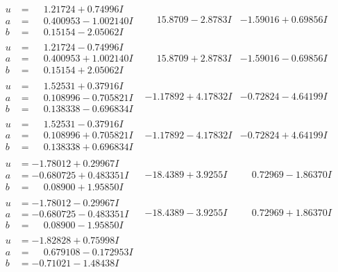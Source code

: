 \documentclass[1p]{elsarticle_modified}
\theoremstyle{definition}
\begin{document}
$$\begin{array}{c|c|c}
\begin{aligned}
u &= \phantom{-}1.21724 + 0.74996 I \\
a &= \phantom{-}0.400953 - 1.002140 I \\
b &= \phantom{-}0.15154 - 2.05062 I\end{aligned}
 & \phantom{-}15.8709 - 2.8783 I & -1.59016 + 0.69856 I \\ \hline\begin{aligned}
u &= \phantom{-}1.21724 - 0.74996 I \\
a &= \phantom{-}0.400953 + 1.002140 I \\
b &= \phantom{-}0.15154 + 2.05062 I\end{aligned}
 & \phantom{-}15.8709 + 2.8783 I & -1.59016 - 0.69856 I \\ \hline\begin{aligned}
u &= \phantom{-}1.52531 + 0.37916 I \\
a &= \phantom{-}0.108996 - 0.705821 I \\
b &= \phantom{-}0.138338 - 0.696834 I\end{aligned}
 & -1.17892 + 4.17832 I & -0.72824 - 4.64199 I \\ \hline\begin{aligned}
u &= \phantom{-}1.52531 - 0.37916 I \\
a &= \phantom{-}0.108996 + 0.705821 I \\
b &= \phantom{-}0.138338 + 0.696834 I\end{aligned}
 & -1.17892 - 4.17832 I & -0.72824 + 4.64199 I \\ \hline\begin{aligned}
u &= -1.78012 + 0.29967 I \\
a &= -0.680725 + 0.483351 I \\
b &= \phantom{-}0.08900 + 1.95850 I\end{aligned}
 & -18.4389 + 3.9255 I & \phantom{-}0.72969 - 1.86370 I \\ \hline\begin{aligned}
u &= -1.78012 - 0.29967 I \\
a &= -0.680725 - 0.483351 I \\
b &= \phantom{-}0.08900 - 1.95850 I\end{aligned}
 & -18.4389 - 3.9255 I & \phantom{-}0.72969 + 1.86370 I \\ \hline\begin{aligned}
u &= -1.82828 + 0.75998 I \\
a &= \phantom{-}0.679108 - 0.172953 I \\
b &= -0.71021 - 1.48438 I\end{aligned}

\end{array}$$
\end{document}
